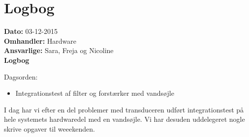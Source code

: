 \section{Logbog}

\textbf{Dato:} 03-12-2015 \\
\textbf{Omhandler:} Hardware \\
\textbf{Ansvarlige:} Sara, Freja og Nicoline \\
\textbf{Logbog}

Dagsorden:
\begin{itemize}
	\item Integrationstest af filter og forstærker med vandsøjle
	
\end{itemize}
I dag har vi efter en del problemer med transduceren udført integrationstest på hele systemets hardwaredel med en vandsøjle. Vi har desuden uddelegeret nogle skrive opgaver til weeekenden.